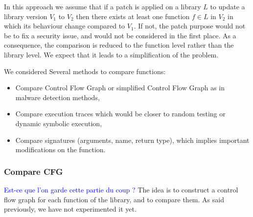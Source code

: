 \documentclass{article}
\newcommand{\ludo}[1]{\textcolor{blue}{#1}}
\begin{document}
 

    
    
    
   
	In this approach we assume that if a patch is applied on a library $L$ to
    update a library version $V_1$ to $V_2$ then there exists at least one
    function $f \in L$ in $V_2$ in which its behaviour change compared to
    $V_1$. If not, the patch purpose would not be to fix a security issue, and
    would not be considered in the first place. 
    As a consequence, the comparison is reduced to the function level rather than
    the library level. We expect that it leads to a simplification of the
    problem.
	
	
  We considered Several methods to compare functions:
	\begin{itemize}
		\item Compare Control Flow Graph or simplified Control Flow Graph as
            in malware detection methods,
		\item Compare execution traces which would be closer to random testing
            or dynamic symbolic execution,
		\item Compare signatures (arguments, name, return type), which implies
            important modifications on the function.
	\end{itemize}
	
	\subsubsection{Compare CFG}
	
    \ludo{Est-ce que l'on garde cette partie du coup ?}
	The idea is to construct a control flow graph for each function of the library, and to compare them. As said previously, we have not experimented it yet.
	
\end{document}
